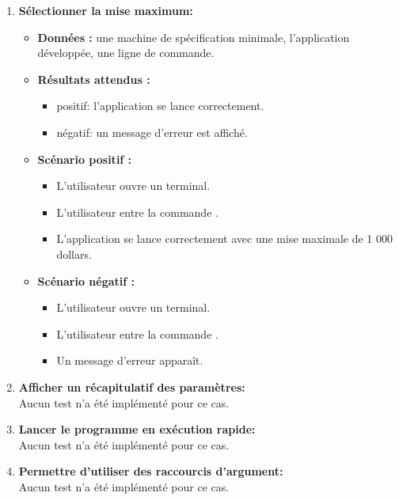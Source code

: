 \begin{enumerate}
    \item \textbf{Sélectionner la mise maximum:}
    \begin{itemize}
        \item \textbf{Données :} une machine de spécification minimale, l'application développée, une ligne de commande.
        \item \textbf{Résultats attendus :} 
        \begin{itemize}
            \item positif: l'application se lance correctement. \item négatif: un message d'erreur est affiché.
        \end{itemize}
        \item \textbf{Scénario positif :}
        \begin{itemize}
            \item L’utilisateur ouvre un terminal.
            \item L’utilisateur entre la commande .
            \item L'application se lance correctement avec une mise maximale de 1 000 dollars.
        \end{itemize}
        \item \textbf{Scénario négatif :}
        \begin{itemize}
            \item L’utilisateur ouvre un terminal.
            \item L’utilisateur entre la commande .
            \item Un message d'erreur apparaît.
        \end{itemize}
    \end{itemize}

    \item \textbf{Afficher un récapitulatif des paramètres:}\\
    Aucun test n'a été implémenté pour ce cas.

    \item \textbf{Lancer le programme en exécution rapide:} \\
    Aucun test n'a été implémenté pour ce cas.

    \item \textbf{Permettre d'utiliser des raccourcis d'argument:}  \\
    Aucun test n'a été implémenté pour ce cas.

\end{enumerate}

